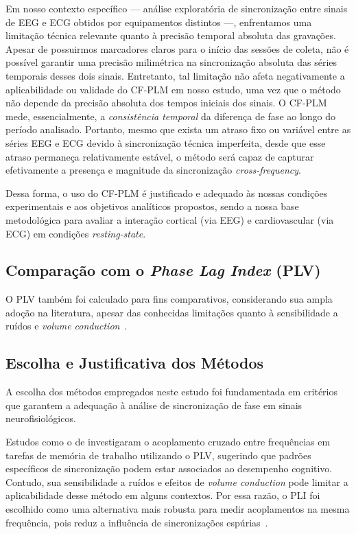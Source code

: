 Em nosso contexto específico — análise exploratória de sincronização entre sinais de EEG e ECG obtidos por equipamentos distintos —, enfrentamos uma limitação técnica relevante quanto à precisão temporal absoluta das gravações. Apesar de possuirmos marcadores claros para o início das sessões de coleta, não é possível garantir uma precisão milimétrica na sincronização absoluta das séries temporais desses dois sinais. Entretanto, tal limitação não afeta negativamente a aplicabilidade ou validade do CF-PLM em nosso estudo, uma vez que o método não depende da precisão absoluta dos tempos iniciais dos sinais. O CF-PLM mede, essencialmente, a \textit{consistência temporal} da diferença de fase ao longo do período analisado. Portanto, mesmo que exista um atraso fixo ou variável entre as séries EEG e ECG devido à sincronização técnica imperfeita, desde que esse atraso permaneça relativamente estável, o método será capaz de capturar efetivamente a presença e magnitude da sincronização \textit{cross-frequency}.

Dessa forma, o uso do CF-PLM é justificado e adequado às nossas condições experimentais e aos objetivos analíticos propostos, sendo a nossa base metodológica para avaliar a interação cortical (via EEG) e cardiovascular (via ECG) em condições \textit{resting-state}.


\subsection{Comparação com o \textit{Phase Lag Index} (PLV)}
O PLV também foi calculado para fins comparativos, considerando sua ampla adoção na literatura, apesar das conhecidas limitações quanto à sensibilidade a ruídos e \textit{volume conduction}~\cite{seraj2018cerebral}.


\subsection{Escolha e Justificativa dos Métodos}
A escolha dos métodos empregados neste estudo foi fundamentada em critérios que garantem a adequação à análise de sincronização de fase em sinais neurofisiológicos.

Estudos como o de  investigaram o acoplamento cruzado entre frequências em tarefas de memória de trabalho utilizando o PLV, sugerindo que padrões específicos de sincronização podem estar associados ao desempenho cognitivo. Contudo, sua sensibilidade a ruídos e efeitos de \textit{volume conduction} pode limitar a aplicabilidade desse método em alguns contextos. Por essa razão, o PLI foi escolhido como uma alternativa mais robusta para medir acoplamentos na mesma frequência, pois reduz a influência de sincronizações espúrias~\cite{seraj2018cerebral, zhang2014phase}.

